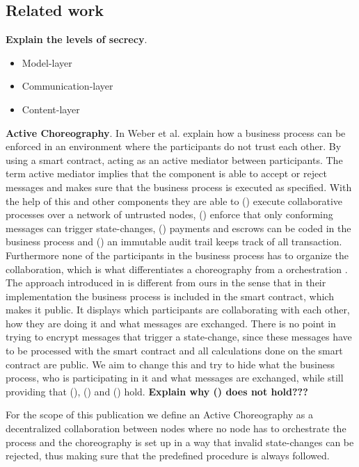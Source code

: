 \documentclass[runningheads]{llncs}
\newcommand{\rom}[1]{(\uppercase\expandafter{\romannumeral #1\relax})}  %
\begin{document}
\subsection{Related work} \label{sec:rel_work}




\bigbreak
\textbf{Explain the levels of secrecy}. 
\begin{itemize}
    \item Model-layer
    \item Communication-layer
    \item Content-layer
\end{itemize}




\bigbreak
\textbf{Active Choreography}. In \cite{weber2016untrusted} Weber et al. explain how a business process can be enforced in an environment where the participants do not trust each other. By using a smart contract, acting as an active mediator between participants. The term active mediator implies that the component is able to accept or reject messages and makes sure that the business process is executed as specified. With the help of this and other components they are able to \rom{1} execute collaborative processes over a network of untrusted nodes, \rom{2} enforce that only conforming messages can trigger state-changes, \rom{3} payments and escrows can be coded in the business process and \rom{4} an immutable audit trail keeps track of all transaction. Furthermore none of the participants in the business process has to organize the collaboration, which is what differentiates a choreography from a orchestration \cite{some_source}. The approach introduced in \cite{weber2016untrusted} is different from ours in the sense that in their implementation the business process is included in the smart contract, which makes it public. It displays which participants are collaborating with each other, how they are doing it and what messages are exchanged. There is no point in trying to encrypt messages that trigger a state-change, since these messages have to be processed with the smart contract and all calculations done on the smart contract are public. We aim to change this and try to hide what the business process, who is participating in it and what messages are exchanged, while still providing that \rom{1}, \rom{2} and \rom{4} hold. \textbf{Explain why \rom{3} does not hold???}

For the scope of this publication we define an Active Choreography as a decentralized collaboration between nodes where no node has to orchestrate the process and the choreography is set up in a way that invalid state-changes can be rejected, thus making sure that the predefined procedure is always followed. 
\end{document}
